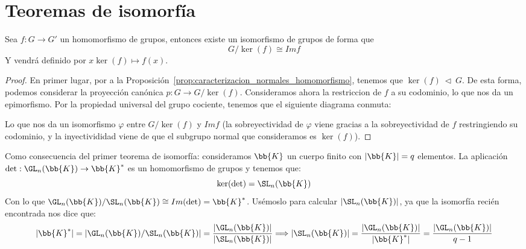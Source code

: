 \section{Teoremas de isomorfía}
\begin{teo}
    Sea $f:G\to G'$ un homomorfismo de grupos, entonces existe un isomorfismo de grupos de forma que
    \begin{equation*}
        G/\ker(f) \cong Imf
    \end{equation*}
    Y vendrá definido por $x\ker(f) \longmapsto f(x)$.
    \begin{proof}
        En primer lugar, por a la Proposición~\ref{prop:caracterizacion_normales_homomorfismo}, tenemos que ${\ker(f)\ \lhd\ G}$. De esta forma, podemos considerar la proyección canónica $p:G\to G/\ker(f)$. Consideramos ahora la restriccion de $f$ a su codominio, lo que nos da un epimorfismo. Por la propiedad universal del grupo cociente, tenemos que el siguiente diagrama conmuta:
    \begin{figure}[H]
        \centering
    \end{figure}
    Lo que nos da un isomorfismo $\varphi$ entre $G/\ker(f)$ y $Imf$ (la sobreyectividad de $\varphi$ viene gracias a la sobreyectividad de $f$ restringiendo su codominio, y la inyectivididad viene de que el subgrupo normal que consideramos es $\ker(f)$).
    \end{proof}
\end{teo}

\begin{ejemplo}
    Como consecuencia del primer teorema de isomorfía: consideramos $\bb{K}$ un cuerpo finito con $|\bb{K}| = q$ elementos. La aplicación $\det:\GL_n(\bb{K})\to \bb{K}^\ast$ es un homomorfismo de grupos y tenemos que:
    \begin{equation*}
        \ker(\det) = \SL_n(\bb{K})
    \end{equation*}
    Con lo que $\GL_n(\bb{K})/\SL_n(\bb{K}) \cong Im(\det) = \bb{K}^\ast$. Usémoslo para calcular $|\SL_n(\bb{K})|$, ya que la isomorfía recién encontrada nos dice que:
    \begin{equation*}
        |\bb{K}^\ast| = |\GL_n(\bb{K})/\SL_n(\bb{K})| = \dfrac{|\GL_n(\bb{K})|}{|\SL_n(\bb{K})|} \Longrightarrow |\SL_n(\bb{K})| = \dfrac{|\GL_n(\bb{K})|}{|\bb{K}^\ast|} = \dfrac{|\GL_n(\bb{K})|}{q-1}
    \end{equation*}
\end{ejemplo}

